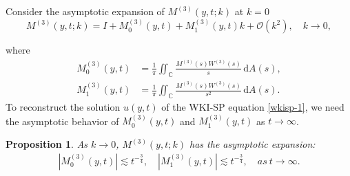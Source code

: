 \documentclass[11pt]{article}
\numberwithin{equation}{section}
\newtheorem{Proposition}{Proposition}
\begin{document}
Consider the asymptotic expansion of $M^{(3)}( y, t;k)$ at $k = 0$
\begin{equation*}
    M^{(3)}(y, t;k) = I + M^{(3)}_0(y, t) + M^{(3)}_1(y, t) k + \mathcal{O}(k^2), \quad k \to 0,
\end{equation*}

where
\begin{align}
    M^{(3)}_0(y, t)& = \frac{1}{\pi} \iint_\mathbb{C} \frac{M^{(3)}(s) W^{(3)}(s)}{s} \, \mathrm{d}A(s),\label{eq39}\\
    M^{(3)}_1(y, t)& = \frac{1}{\pi} \iint_\mathbb{C} \frac{M^{(3)}(s) W^{(3)}(s)}{s^2} \, \mathrm{d}A(s).\label{eq40}
\end{align}
To reconstruct the solution $u(y, t)$ of the WKI-SP equation \eqref{wkisp-1}, we need the asymptotic behavior of $M^{(3)}_0(y, t)$ and $M^{(3)}_1(y, t)$ as $t\to\infty$.
\begin{Proposition}\label{p18}
As $k \rightarrow 0$, $M^{(3)}(y,t;k)$ has the asymptotic expansion:
\begin{align}
|M^{(3)}_0(y,t)|\lesssim t^{-\frac{3}{4}},\quad |M^{(3)}_1(y,t)|\lesssim t^{-\frac{3}{4}},\quad as\ t\rightarrow \infty.
\end{align}
\end{Proposition}
\end{document}
